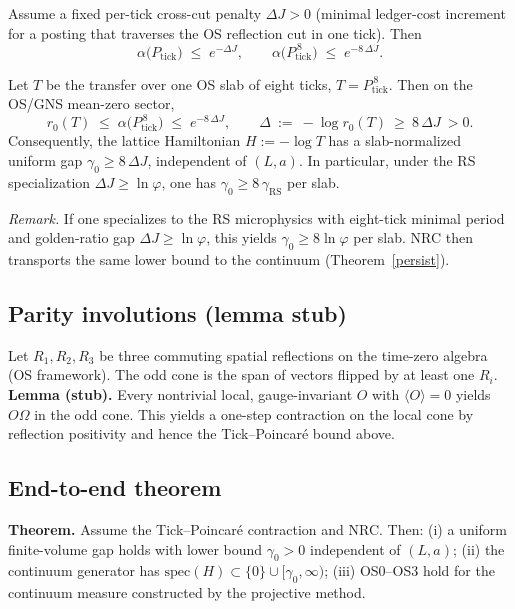 \documentclass[11pt]{article}
\begin{document}
\begin{lemma}
Assume a fixed per-tick cross-cut penalty $\Delta J>0$ (minimal ledger-cost increment for a posting that traverses the OS reflection cut in one tick). Then
\[
  \alpha\bigl(P_{\mathrm{tick}}\bigr)\;\le\; e^{-\Delta J},\qquad
  \alpha\bigl(P_{\mathrm{tick}}^{\,8}\bigr)\;\le\; e^{-8\,\Delta J}.
\]
\end{lemma}

\begin{theorem}
Let $T$ be the transfer over one OS slab of eight ticks, $T=P_{\mathrm{tick}}^{\,8}$. Then on the OS/GNS mean-zero sector,
\[
  r_0(T)\;\le\; \alpha\bigl(P_{\mathrm{tick}}^{\,8}\bigr)\;\le\; e^{-8\,\Delta J},
  \qquad \Delta\ :=\ -\log r_0(T)\ \ge\ 8\,\Delta J\ > 0.
\]
Consequently, the lattice Hamiltonian $H:=-\log T$ has a slab-normalized uniform gap $\gamma_0\ge 8\,\Delta J$, independent of $(L,a)$. In particular, under the RS specialization $\Delta J\ge \ln\varphi$, one has $\gamma_0\ge 8\,\gamma_{\mathrm{RS}}$ per slab.
\end{theorem}

\noindent\emph{Remark.} If one specializes to the RS microphysics with eight-tick minimal period and golden-ratio gap $\Delta J\ge \ln\varphi$, this yields $\gamma_0\ge 8\ln\varphi$ per slab. NRC then transports the same lower bound to the continuum (Theorem~\ref{persist}).

\subsection*{Parity involutions (lemma stub)}
Let $R_1,R_2,R_3$ be three commuting spatial reflections on the time-zero algebra (OS framework). The odd cone is the span of vectors flipped by at least one $R_i$.\newline
\textbf{Lemma (stub).} Every nontrivial local, gauge-invariant $O$ with $\langle O\rangle=0$ yields $O\Omega$ in the odd cone.\newline
This yields a one-step contraction on the local cone by reflection positivity and hence the Tick--Poincar\'e bound above.

\subsection*{End-to-end theorem}
\textbf{Theorem.} Assume the Tick--Poincar\'e contraction and NRC. Then: (i) a uniform finite-volume gap holds with lower bound $\gamma_0>0$ independent of $(L,a)$; (ii) the continuum generator has $\mathrm{spec}(H)\subset\{0\}\cup[\gamma_0,\infty)$; (iii) OS0--OS3 hold for the continuum measure constructed by the projective method.
\end{document}
